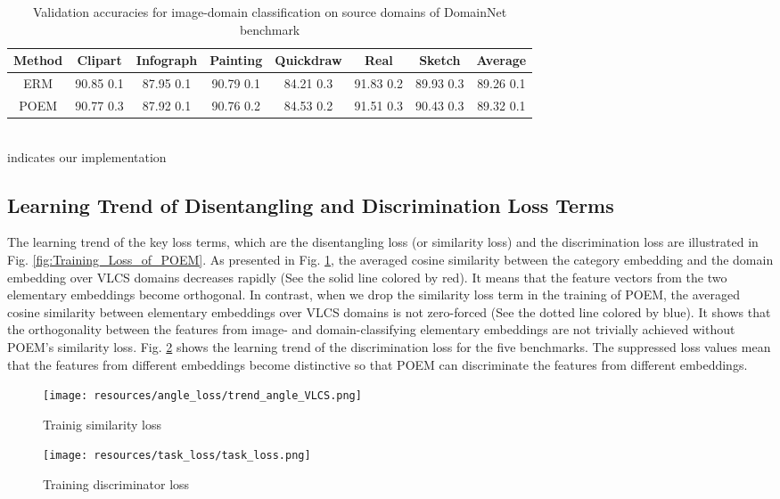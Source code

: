 \documentclass[letterpaper]{article} \usepackage{aaai23}  \usepackage{times}  \usepackage{helvet}  \usepackage{courier}  \usepackage[hyphens]{url}  \usepackage{graphicx} \urlstyle{rm} \def\UrlFont{\rm}  \usepackage{natbib}  \usepackage{caption} \frenchspacing  \setlength{\pdfpagewidth}{8.5in}  \setlength{\pdfpageheight}{11in}  \usepackage[labelsep=period]{caption}
\begin{document}
\begin{table}[H]
\centering
	\begin{tabular}{ccccccc|c}
		\toprule
		\textbf{Method} & Clipart & Infograph & Painting & Quickdraw & Real & Sketch & Average\\
		\midrule
		ERM & 90.85  0.1 & 87.95  0.1 & 90.79  0.1 & 84.21  0.3 & 91.83  0.2 & 89.93  0.3 & 89.26  0.1\\
		POEM & 90.77  0.3  & 87.92  0.1  & 90.76  0.2  & 84.53  0.2 & 91.51  0.3 & 90.43  0.3 & 89.32  0.1\\
		\hline
	\end{tabular}
	\footnotesize{\\ indicates our implementation}\\
        \caption{Validation accuracies for image-domain classification on source domains of DomainNet benchmark}
        \label{tab:domain_dn}
\end{table}	

\subsection{Learning Trend of Disentangling and Discrimination Loss Terms}
The learning trend of the key loss terms, which are the disentangling loss (or similarity loss)  and the discrimination loss  are illustrated in Fig. \ref{fig:Training_Loss_of_POEM}. As presented in Fig. \ref{fig:loss_s}, the averaged cosine similarity between the category embedding and the domain embedding over VLCS domains decreases rapidly (See the solid line colored by red). 
It means that the feature vectors from the two elementary embeddings become orthogonal. In contrast, when we drop the similarity loss term in the training of POEM, the averaged cosine similarity between elementary embeddings over VLCS domains is not zero-forced (See the dotted line colored by blue). 
It shows that the orthogonality between the features from image- and domain-classifying elementary embeddings are not trivially achieved without POEM's similarity loss. 
Fig. \ref{fig:loss_d} shows the learning trend of the discrimination loss for the five benchmarks. 
The suppressed loss values mean that the features from different embeddings become distinctive so that POEM can discriminate the features from different embeddings. 

\begin{figure*}
	\captionsetup{justification=centering}
	\centering
	\begin{subfigure}[hbt]{0.48\textwidth}
		\centering
		\texttt{[image: resources/angle\_loss/trend\_angle\_VLCS.png]}
		\caption{Trainig similarity loss }
		\label{fig:loss_s}
	\end{subfigure}
	\begin{subfigure}[hbt]{0.48\textwidth}
		\centering
		\texttt{[image: resources/task\_loss/task\_loss.png]}
		\caption{Training discriminator loss }
		\label{fig:loss_d}
	\end{subfigure}
	\caption{Learning trend of the component losses of POEM}
	\label{fig:Training_Loss_of_POEM}
\end{figure*}
\end{document}
